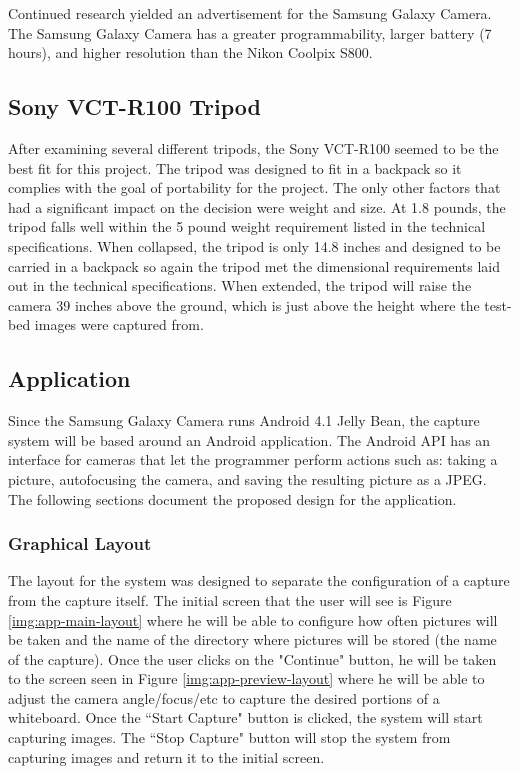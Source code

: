 \documentclass[]{article}
\begin{document}
					Continued research yielded an advertisement for the Samsung Galaxy Camera. The Samsung Galaxy Camera has a greater programmability, larger battery (7 hours), and higher resolution than the Nikon Coolpix S800.
				
			\subsection{Sony VCT-R100 Tripod}
				After examining several different tripods, the Sony VCT-R100 seemed to be the best fit for this project. The tripod was designed to fit in a backpack so it complies with the goal of portability for the project. The only other factors that had a significant impact on the decision were weight and size. At 1.8 pounds, the tripod falls well within the 5 pound weight requirement listed in the technical specifications. When collapsed, the tripod is only 14.8 inches and designed to be carried in a backpack so again the tripod met the dimensional requirements laid out in the technical specifications. When extended, the tripod will raise the camera 39 inches above the ground, which is just above the height where the test-bed images were captured from. 
			
			\subsection{Application}
				Since the Samsung Galaxy Camera runs Android 4.1 Jelly Bean, the capture system will be based around an Android application. The Android API has an interface for cameras that let the programmer perform actions such as: taking a picture, autofocusing the camera, and saving the resulting picture as a JPEG. The following sections document the proposed design for the application.
				
				\subsubsection{Graphical Layout}
					The layout for the system was designed to separate the configuration of a capture from the capture itself. The initial screen that the user will see is Figure \ref{img:app-main-layout} where he will be able to configure how often pictures will be taken and the name of the directory where pictures will be stored (the name of the capture). Once the user clicks on the "Continue" button, he will be taken to the screen seen in Figure \ref{img:app-preview-layout} where he will be able to adjust the camera angle/focus/etc to capture the desired portions of a whiteboard. Once the ``Start Capture" button is clicked, the system will start capturing images. The ``Stop Capture" button will stop the system from capturing images and return it to the initial screen. 
					
\end{document}
